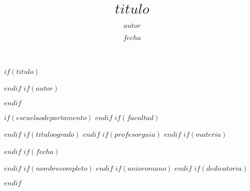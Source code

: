 \documentclass[12pt,reqno,oneside,pdftex]{formato-puc/puctesis} %
\begin{document}


$if(titulo)$
\title{$titulo$}
$endif$
$if(autor)$
\author{$autor$}
$endif$

$if(escuelaodepartamento)$
$endif$
$if(facultad)$
\address{$facultad$\\
         Pontificia Universidad Cat\'olica de Chile\\ 
         Vicu\~na Mackenna 4860\\
         Santiago, Chile\\
         {\it Tel.\/} : 56 (2) 354-2000}
$endif$
$if(tituloogrado)$
$endif$
$if(profesorguia)$
$endif$
$if(materia)$
\subject      {$materia$}
$endif$
$if(fecha)$
\date         {$fecha$}
$endif$
$if(nombrecompleto)$
$endif$
$if(anioromano)$
$endif$
$if(dedicatoria)$
\dedication   {$dedicatoria$}
$endif$


\PageNumbersFootCentered       %
\maketitle


\end{document}
